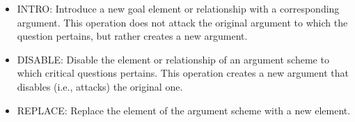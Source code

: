 \begin{itemize} 
\item \textsf{INTRO}: Introduce a new goal element or relationship with a corresponding argument. This operation does not attack the original argument to which the question pertains, but rather creates a new argument. %
\item \textsf{DISABLE:} Disable the element or relationship of an argument scheme to which critical questions pertains. This operation creates a new argument that disables (i.e., attacks) the original one. %
\item \textsf{REPLACE:} Replace the element of the argument scheme with a new element. %

\end{itemize}
